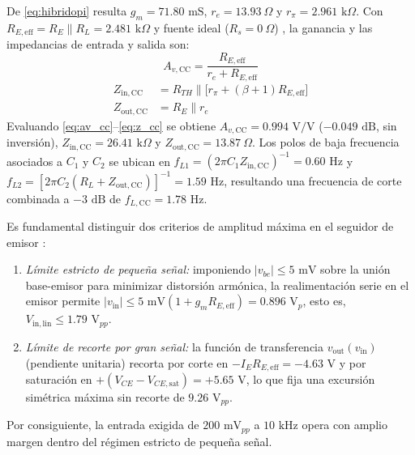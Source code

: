 \documentclass[conference]{IEEEtran}
\begin{document}
De \eqref{eq:hibridopi} resulta $g_m = 71.80\text{ mS}$, $r_e = 13.93\ \Omega$ y $r_\pi = 2.961\text{ k}\Omega$. Con $R_{E,\mathrm{eff}} = R_E \parallel R_L = 2.481\text{ k}\Omega$ y fuente ideal ($R_s = 0\ \Omega$) \cite{sedra2020}, la ganancia y las impedancias de entrada y salida son:
\begin{equation}
A_{v,\mathrm{CC}} = \frac{R_{E,\mathrm{eff}}}{r_e + R_{E,\mathrm{eff}}}
\label{eq:av_cc}
\end{equation}
\begin{equation}
\begin{aligned}
Z_{\mathrm{in,CC}} &= R_{TH} \parallel \bigl[r_\pi + (\beta + 1)R_{E,\mathrm{eff}}\bigr] \\
Z_{\mathrm{out,CC}} &= R_E \parallel r_e
\end{aligned}
\label{eq:z_cc}
\end{equation}
Evaluando \eqref{eq:av_cc}--\eqref{eq:z_cc} se obtiene $A_{v,\mathrm{CC}} = 0.994\text{ V/V}$ ($-0.049\text{ dB}$, sin inversi\'on), $Z_{\mathrm{in,CC}} = 26.41\text{ k}\Omega$ y $Z_{\mathrm{out,CC}} = 13.87\ \Omega$. Los polos de baja frecuencia asociados a $C_1$ y $C_2$ se ubican en $f_{L1} = (2\pi C_1 Z_{\mathrm{in,CC}})^{-1} = 0.60\text{ Hz}$ y $f_{L2} = [2\pi C_2 (R_L + Z_{\mathrm{out,CC}})]^{-1} = 1.59\text{ Hz}$, resultando una frecuencia de corte combinada a $-3\text{ dB}$ de $f_{L,\mathrm{CC}} = 1.78\text{ Hz}$.

Es fundamental distinguir dos criterios de amplitud m\'axima en el seguidor de emisor \cite{sedra2020}:
\begin{enumerate}
\item \textit{L\'imite estricto de peque\~na se\~nal:} imponiendo $|v_{be}| \le 5\text{ mV}$ sobre la uni\'on base-emisor para minimizar distorsi\'on arm\'onica, la realimentaci\'on serie en el emisor permite $|v_{\mathrm{in}}| \le 5\text{ mV}(1 + g_m R_{E,\mathrm{eff}}) = 0.896\text{ V}_p$, esto es, $V_{\mathrm{in,lin}} \le 1.79\text{ V}_{pp}$.
\item \textit{L\'imite de recorte por gran se\~nal:} la funci\'on de transferencia $v_{\mathrm{out}}(v_{\mathrm{in}})$ (pendiente unitaria) recorta por corte en $-I_E R_{E,\mathrm{eff}} = -4.63\text{ V}$ y por saturaci\'on en $+(V_{CE} - V_{CE,\mathrm{sat}}) = +5.65\text{ V}$, lo que fija una excursi\'on sim\'etrica m\'axima sin recorte de $9.26\text{ V}_{pp}$.
\end{enumerate}
Por consiguiente, la entrada exigida de $200\text{ mV}_{pp}$ a $10\text{ kHz}$ opera con amplio margen dentro del r\'egimen estricto de peque\~na se\~nal.
\end{document}
